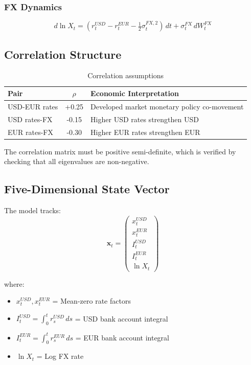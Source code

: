 \documentclass[10pt,a4paper]{article}
\begin{document}
\subsubsection{FX Dynamics}
\[
d\ln X_t = (r_t^{USD} - r_t^{EUR} - \tfrac{1}{2}\sigma_t^{FX,2})\,dt + \sigma_t^{FX}\,dW_t^{FX}
\]

\subsection{Correlation Structure}

\begin{table}[H]
\centering
\begin{tabular}{lcp{7cm}}
\toprule
\textbf{Pair} & \textbf{$\rho$} & \textbf{Economic Interpretation} \\
\midrule
USD-EUR rates & +0.25 & Developed market monetary policy co-movement \\
USD rates-FX & -0.15 & Higher USD rates strengthen USD \\
EUR rates-FX & -0.30 & Higher EUR rates strengthen EUR \\
\bottomrule
\end{tabular}
\caption{Correlation assumptions}
\end{table}

The correlation matrix must be positive semi-definite, which is verified by checking that all eigenvalues are non-negative.

\subsection{Five-Dimensional State Vector}

The model tracks:
\[
\mathbf{x}_t = \begin{pmatrix}
x_t^{USD} \\
x_t^{EUR} \\
I_t^{USD} \\
I_t^{EUR} \\
\ln X_t
\end{pmatrix}
\]

where:
\begin{itemize}
    \item $x_t^{USD}, x_t^{EUR}$ = Mean-zero rate factors
    \item $I_t^{USD} = \int_0^t r_s^{USD}\,ds$ = USD bank account integral
    \item $I_t^{EUR} = \int_0^t r_s^{EUR}\,ds$ = EUR bank account integral
    \item $\ln X_t$ = Log FX rate
\end{itemize}
\end{document}
